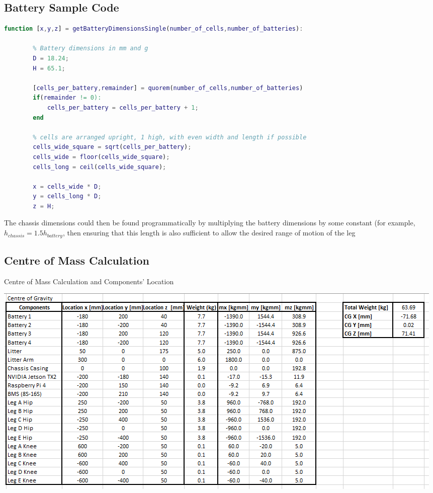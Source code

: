 \subsection{Battery Sample Code} \label{app:battery}
\noindent\begin{minipage}{\textwidth}
    \begin{lstlisting}[language=Matlab,caption=Battery dimension calculator - Basic]
    function [x,y,z] = getBatteryDimensionsSingle(number_of_cells,number_of_batteries): 
        
        % Battery dimensions in mm and g
        D = 18.24;
        H = 65.1;
        
        [cells_per_battery,remainder] = quorem(number_of_cells,number_of_batteries)
        if(remainder != 0):
            cells_per_battery = cells_per_battery + 1;
        end
        
        % cells are arranged upright, 1 high, with even width and length if possible
        cells_wide_square = sqrt(cells_per_battery);
        cells_wide = floor(cells_wide_square);
        cells_long = ceil(cells_wide_square);
        
        x = cells_wide * D;
        y = cells_long * D;
        z = H;
    \end{lstlisting}
\end{minipage}

The chassis dimensions could then be found programmatically by multiplying the battery dimensions by some constant (for example, $h_{chassis} = 1.5 h_{battery}$, then ensuring that this length is also sufficient to allow the desired range of motion of the leg

\subsection{Centre of Mass Calculation} \label{app:centre_of_mass}

\begin{table}[H]
\centering
  \caption{Centre of Mass Calculation and Components' Location}
  \label{table:weight_distribution}
  \includegraphics[width=\textwidth]{7_Appendices/img/WeightDistribution.PNG}
\end{table}

